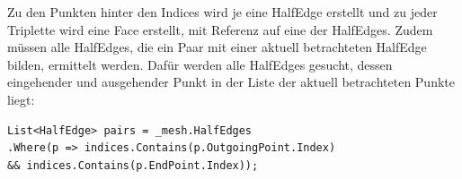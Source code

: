 Zu den Punkten hinter den Indices wird je eine HalfEdge erstellt und zu jeder Triplette wird eine Face erstellt, mit Referenz auf eine der HalfEdges. Zudem m\"ussen alle HalfEdges, die ein Paar mit einer aktuell betrachteten HalfEdge bilden, ermittelt werden. Daf\"ur werden alle HalfEdges gesucht, dessen eingehender und ausgehender Punkt in der Liste der aktuell betrachteten Punkte liegt: 
\begin{lstlisting}
List<HalfEdge> pairs = _mesh.HalfEdges
.Where(p => indices.Contains(p.OutgoingPoint.Index)
&& indices.Contains(p.EndPoint.Index));
\end{lstlisting}